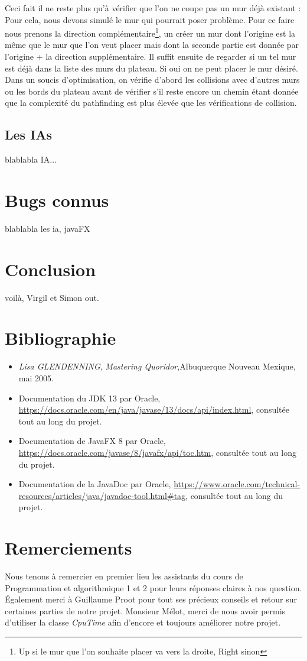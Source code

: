 \documentclass[a4paper, 12pt]{article}
\begin{document}
Ceci fait il ne reste plus qu'à vérifier que l'on ne coupe pas un mur déjà existant : \\
Pour cela, nous devons simulé le mur qui pourrait poser problème. Pour ce faire nous prenons la direction complémentaire\footnote{Up si le mur que l'on souhaite placer va vers la droite, Right sinon}, un créer un mur dont l'origine est la même que le mur que l'on veut placer mais dont la seconde partie est donnée par l'origine + la direction supplémentaire. Il suffit ensuite de regarder si un tel mur est déjà dans la liste des murs du plateau. Si oui on ne peut placer le mur désiré. \\
Dans un soucis d'optimisation, on vérifie d'abord les collisions avec d'autres murs ou les bords du plateau avant de vérifier s'il reste encore un chemin étant donnée que la complexité du pathfinding est plus élevée que les vérifications de collision.

\subsection{Les IAs}
blablabla IA...
\section{Bugs connus}
blablabla les ia, javaFX 

\section{Conclusion}

voilà, Virgil et Simon out.

\section{Bibliographie}
\begin{itemize}
\item \emph{Lisa GLENDENNING}, \textit{Mastering Quoridor},Albuquerque Nouveau Mexique, mai 2005.
\item Documentation du JDK 13 par Oracle, \url{https://docs.oracle.com/en/java/javase/13/docs/api/index.html}, consultée tout au long du projet.
\item Documentation de JavaFX 8 par Oracle, \url{https://docs.oracle.com/javase/8/javafx/api/toc.htm}, consultée tout au long du projet.
\item Documentation de la JavaDoc par Oracle, \url{https://www.oracle.com/technical-resources/articles/java/javadoc-tool.html#tag}, consultée tout au long du projet.
\end{itemize}

\section{Remerciements}

Nous tenons à remercier en premier lieu les assistants du cours de Programmation et algorithmique 1 et 2 pour leurs réponses claires à nos question.
Également merci à Guillaume Proot pour tout ses précieux conseils et retour sur certaines parties de notre projet.
Monsieur Mélot, merci de nous avoir permis d'utiliser la classe \textit{CpuTime} afin d'encore et toujours améliorer notre projet.
\end{document}
